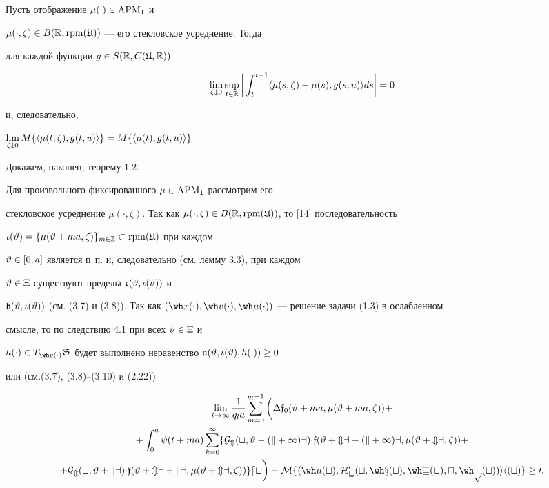 \begin{thms}


Пусть отображение $\mu(\cdot)\in \operatorname{APM}_{1}$ и


$\mu(\cdot,\zeta)\in B(\Bbb R,\operatorname{rpm}(\frak U))$ --- его стекловское усреднение. Тогда


для каждой функции $g\in S(\Bbb R,C(\frak U,\Bbb R))$


$$


\lim_{\zeta\downarrow0}\sup_{t\in\R}\bigg|\int_{t}^{t+1}


\la\mu(s,\zeta)-\mu(s),g(s,u)\ra ds\bigg|=0


$$


и, следовательно,


$\lim\lt_{\zeta\downarrow0}M\{\la\mu(t,\zeta),g(t,u)\ra\}


=M\{\la\mu(t),g(t,u)\ra\}$.


\end{thms}





Докажем, наконец, теорему 1.2.


Для произвольного фиксированного $\mu\in\operatorname{APM}_1$ рассмотрим его


стекловское усреднение $\mu(\cdot,\zeta)$. Так как $\mu(\cdot,\zeta)\in


B(\R,\rpm(\gU))$, то [14] последовательность


$\iota(\vartheta)=\{\mu(\vartheta+ma,\zeta)\}_{m\in\Bbb Z}\subset\operatorname{rpm}(\frak U)$ при каждом


$\vartheta\in[0,a]$ является п.\,п. и, следовательно (см. лемму 3.3), при каждом


$\vartheta\in\Xi$ существуют пределы $\frak c(\vartheta,\iota(\vartheta))$ и


$\frak b(\vt,\iota(\vt))$ (см. (3.7) и (3.8)). Так как $(\wh x(\cdot), \wh


v(\cdot), \wh\mu(\cdot))$ --- решение задачи (1.3) в ослабленном


смысле, то по следствию 4.1 при всех $\vartheta\in\Xi$ и


$h(\cdot)\in T_{\wh v(\cdot)}


\gS$ будет выполнено неравенство $\frak a(\vt,\iota(\vt),h(\cdot))\ge0$


или (см.(3.7), (3.8)--(3.10) и (2.22))


\begin{gather*}


\lim_{l\to\infty}\frac{1}{q_l a}\sum_{m=0}^{q_l-1}


\bigg(\Dl\frak{f}_0(\vt+ma, \mu(\vt+ma,\zeta))+ \\


+\int_{0}^{a} \psi(t+ma) \sum_{k=0}^{\infty}


\{\pG_m(t,\vt-(k+1)a) \Dl\frak{f}(\vt+ma-(k+1)a, \mu(\vt+ma,\zeta))+\\


+\pG_m(t,\vt+ka)\Dl\frak{f}(\vt+ma+ka, \mu(\vt+ma,\zeta))\}dt\bigg)-


M\{\la\wh\mu(t),H_v'(t,\wh x(t),\wh v(t),u,\wh p(t))\ra h(t)\}\ge 0.


\end{gather*}


